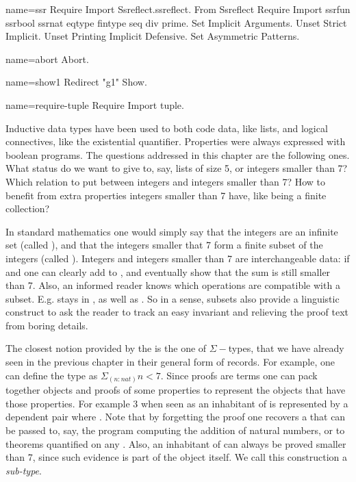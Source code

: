 \begin{coqdef}{name=ssr}
Require Import Ssreflect.ssreflect.
From Ssreflect Require Import ssrfun ssrbool ssrnat eqtype fintype seq div prime.
Set Implicit Arguments.
Unset Strict Implicit.
Unset Printing Implicit Defensive.
Set Asymmetric Patterns.
\end{coqdef}
\begin{coqdef}{name=abort}
Abort.
\end{coqdef}
\begin{coqdef}{name=show1}
Redirect "g1" Show.
\end{coqdef}
\begin{coqdef}{name=require-tuple}
Require Import tuple.
\end{coqdef}

\label{ch:sigmabool}

Inductive data types have been used to both code data, like lists, and
logical connectives, like the existential quantifier.
Properties were always expressed with
boolean programs.  The questions addressed in this chapter are the
following ones.  What
status do we want to give to, say, lists of size 5,  or integers
smaller than 7?  Which relation to put between integers and
integers smaller than 7?  How to benefit from extra properties
integers smaller than 7 have, like being a finite collection?

In standard mathematics one would simply say that the integers are an
infinite set (called ), and that the integers smaller that 7
form a finite subset of the integers (called ).  Integers and
integers smaller than 7 are interchangeable data: if  and
 one can clearly add  to , and eventually show
that the sum is still smaller than 7.  Also, an informed reader
knows which operations are compatible with a subset. E.g. 
stays in , as well as .  So in a sense, subsets
also provide a linguistic construct to ask the reader to track an
easy invariant and relieving the proof text from boring details.

The closest notion provided by the \mcbCIC{} is the one of $\Sigma-$types,
that we have already seen in the previous chapter in their general
form of records.
For example, one can define the type  as $\Sigma_{(n:nat)} n
< 7$.  Since proofs are terms one can
pack together objects and proofs of some properties to
represent the objects that have those properties.  For example $3$
when seen as an inhabitant of  is represented by a dependent
pair  where .  Note that by forgetting the
proof  one recovers a  that can be passed to, say, the
program computing the addition of natural numbers, or to theorems
quantified on any .  Also, an inhabitant of  can always
be proved smaller than 7, since such evidence is part of the
object itself.
We call this construction a \emph{sub-type}.

